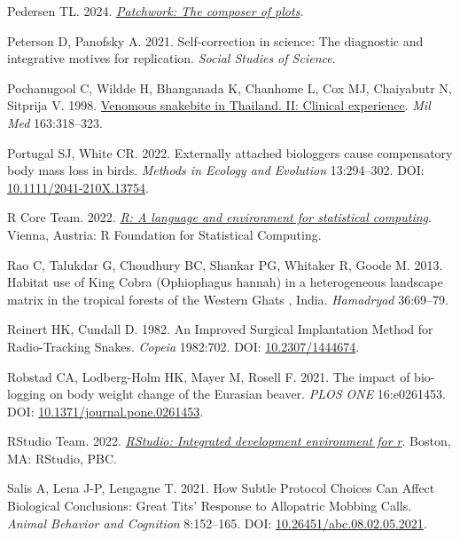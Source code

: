 \documentclass[10pt,a4paper]{article}
\newlength{\cslhangindent}
\newenvironment{CSLReferences}[2] %
 {\begin{list}{}{%
  \setlength{\itemindent}{0pt}
  \setlength{\leftmargin}{0pt}
  \setlength{\parsep}{0pt}
  \ifodd #1
   \setlength{\leftmargin}{\cslhangindent}
   \setlength{\itemindent}{-1\cslhangindent}
  \fi
  \setlength{\itemsep}{#2\baselineskip}}}
 {\end{list}}
\begin{document}
\begin{CSLReferences}{1}{0}
Pedersen TL. 2024. \emph{\href{https://CRAN.R-project.org/package=patchwork}{Patchwork: The composer of plots}}.

Peterson D, Panofsky A. 2021. Self-correction in science: {The} diagnostic and integrative motives for replication. \emph{Social Studies of Science}.

Pochanugool C, Wildde H, Bhanganada K, Chanhome L, Cox MJ, Chaiyabutr N, Sitprija V. 1998. \href{https://www.ncbi.nlm.nih.gov/pubmed/9597849}{Venomous snakebite in {Thailand}. {II}: {Clinical} experience}. \emph{Mil Med} 163:318--323.

Portugal SJ, White CR. 2022. Externally attached biologgers cause compensatory body mass loss in birds. \emph{Methods in Ecology and Evolution} 13:294--302. DOI: \href{https://doi.org/10.1111/2041-210X.13754}{10.1111/2041-210X.13754}.

R Core Team. 2022. \emph{\href{https://www.R-project.org/}{R: A language and environment for statistical computing}}. Vienna, Austria: R Foundation for Statistical Computing.

Rao C, Talukdar G, Choudhury BC, Shankar PG, Whitaker R, Goode M. 2013. Habitat use of {King} {Cobra} ({Ophiophagus} hannah) in a heterogeneous landscape matrix in the tropical forests of the {Western} {Ghats} , {India}. \emph{Hamadryad} 36:69--79.

Reinert HK, Cundall D. 1982. An {Improved} {Surgical} {Implantation} {Method} for {Radio}-{Tracking} {Snakes}. \emph{Copeia} 1982:702. DOI: \href{https://doi.org/10.2307/1444674}{10.2307/1444674}.

Robstad CA, Lodberg-Holm HK, Mayer M, Rosell F. 2021. The impact of bio-logging on body weight change of the {Eurasian} beaver. \emph{PLOS ONE} 16:e0261453. DOI: \href{https://doi.org/10.1371/journal.pone.0261453}{10.1371/journal.pone.0261453}.

RStudio Team. 2022. \emph{\href{http://www.rstudio.com/}{{RStudio}: Integrated development environment for r}}. Boston, MA: RStudio, PBC.

Salis A, Lena J-P, Lengagne T. 2021. How {Subtle} {Protocol} {Choices} {Can} {Affect} {Biological} {Conclusions}: {Great} {Tits}' {Response} to {Allopatric} {Mobbing} {Calls}. \emph{Animal Behavior and Cognition} 8:152--165. DOI: \href{https://doi.org/10.26451/abc.08.02.05.2021}{10.26451/abc.08.02.05.2021}.


\end{CSLReferences}
\end{document}
